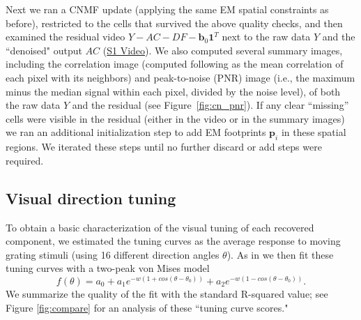 \documentclass[10pt,letterpaper]{article}
\def \videoOneURL{https://www.dropbox.com/s/0ph27nsx5fxcc1b/demixing_scan_1_201_9100.avi?dl=0}
\begin{document}
{Next we ran a CNMF update (applying the same EM spatial constraints as before), restricted to the cells that survived the above quality checks, and then examined the residual video $Y-AC-DF-\bm{b}_0 \bm{1}^T$ next to the raw data $Y$ and the ``denoised" output $AC$ (\href{\videoOneURL}{S1 Video}).  We also computed several summary images, including the correlation image (computed following \citep{Smith2010} as the mean correlation of each pixel with its neighbors) and peak-to-noise (PNR) image (i.e., the maximum minus the median signal within each pixel, divided by the noise level), 
of both the raw data $Y$ and the residual (see Figure~\ref{fig:cn_pnr}).  If any clear ``missing'' cells were visible in the residual (either in the video or in the summary images) we ran an additional initialization step to add EM footprints $\bm{p}_i$ in these spatial regions.  We iterated these steps until no further discard or add steps were required.

\subsection{Visual direction tuning} 
\label{sec:tc_score}
To obtain a basic characterization of the visual tuning of each recovered component, we estimated the tuning curves as the average response to moving grating stimuli (using 16 different direction angles $\theta$).  As in \citep{reimer_pupil_2014} we then fit these tuning curves with a two-peak von Mises model
\begin{equation}
f(\theta) = a_0 + a_1e^{-w(1+cos(\theta-\theta_0))} + a_2e^{-w(1-cos(\theta-\theta_0))}. 
\end{equation} 
We summarize the quality of the fit with the standard R-squared value; see Figure \ref{fig:compare} for an analysis of these ``tuning curve scores."



}
\end{document}

